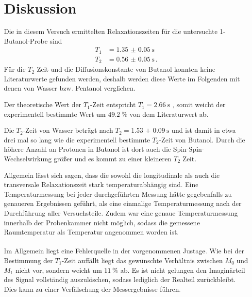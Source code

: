 \section{Diskussion}
Die in diesem Versuch ermittelten Relaxationszeiten für die untersuchte 1-Butanol-Probe sind
\begin{align*}
  T_1 &= \SI{1.35(005)}{\second} \\
  T_2 &= \SI{0.56(005)}{\second} \, .
\end{align*}
Für die $T_2$-Zeit und die Diffusionskonstante von Butanol konnten keine Literaturwerte gefunden werden, deshalb werden diese Werte im Folgenden mit denen von Wasser bzw. Pentanol verglichen.

Der theoretische Wert der $T_1$-Zeit entspricht $T_1 = \SI{2.66}{\second}$ \cite{T1}, somit weicht der experimentell bestimmte Wert um $\SI{49.2}{\percent}$ von dem Literaturwert ab.


Die $T_2$-Zeit von Wasser beträgt nach \cite{chang} $T_2 = \SI{1.53(9)}{\second}$ und ist damit in etwa drei mal so lang wie die experimentell bestimmte $T_2$-Zeit von Butanol.
Durch die höhere Anzahl an Protonen in Butanol ist dort auch die Spin-Spin-Wechselwirkung größer und es kommt zu einer kleineren $T_2$ Zeit.

Allgemein lässt sich sagen, dass die sowohl die longitudinale als auch die transversale Relaxationszeit stark temperaturabhängig
sind. Eine Temperaturmessung bei jeder durchgeführten Messung hätte gegebenfalls zu genaueren Ergebnissen geführt,
als eine einmalige Temperaturmessung nach der Durchführung aller Versuchsteile.
Zudem war eine genaue Temperaturmessung innerhalb der Probenkammer nicht möglich, sodass die gemessene Raumtemperatur als
Temperatur angenommen worden ist. \\
\\
Im Allgemein liegt eine Fehlerquelle in der vorgenommenen Justage. Wie bei der Bestimmung der $T_1$-Zeit auffällt liegt
das gewünschte Verhältnis zwischen $M_0$ und $M_1$ nicht vor, sondern weicht um $\SI{11}{\percent}$ ab.
Es ist nicht gelungen den Imaginärteil des Signal vollständig auszulöschen, sodass lediglich der Realteil zurückbleibt.
Dies kann zu einer Verfälschung der Messergebnisse führen. \\


